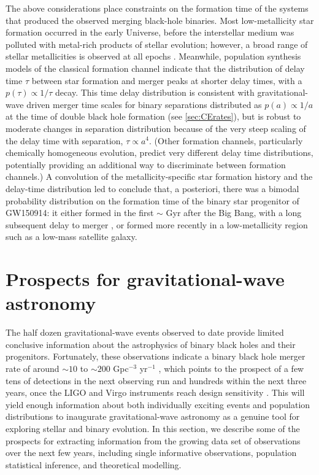 \documentclass[review]{elsarticle}
\begin{document}
The above considerations place constraints on the formation time of the systems that produced the observed merging black-hole binaries. Most low-metallicity star formation occurred in the early Universe, before the interstellar medium was polluted with metal-rich products of stellar evolution; however, a broad range of stellar metallicities is observed at all epochs  \citep[e.g.,][]{LangerNorman:2006,TaylorKobayashi:2015}. Meanwhile, population synthesis models of the classical formation channel indicate that the distribution of delay time $\tau$ between star formation and merger peaks at shorter delay times, with a $p(\tau) \propto 1/\tau$ decay.  This time delay distribution is consistent with gravitational-wave driven merger time scales for binary separations distributed as $p(a) \propto 1/a$ at the time of double black hole formation (see \autoref{sec:CErates}), but  is robust to moderate changes in separation distribution because of the very steep scaling of the delay time with separation, $\tau \propto a^4$.  (Other formation channels, particularly chemically homogeneous evolution, predict very different delay time distributions, potentially providing an additional way to discriminate between formation channels.)  A convolution of the metallicity-specific star formation history and the delay-time distribution led \citet{Belczynski:2016} to conclude that, a posteriori, there was a bimodal probability distribution on the formation time of the binary star progenitor of GW150914: it either formed in the first $\sim$ Gyr after the Big Bang, with a long subsequent delay to merger \citep{Dominik:2014}, or formed more recently in a low-metallicity region such as a low-mass satellite galaxy.  

  

\section{Prospects for gravitational-wave astronomy}\label{prospect}

The half dozen gravitational-wave events observed to date provide limited conclusive information about the astrophysics of binary black holes and their progenitors.  Fortunately, these observations indicate a binary black hole merger rate of around $\sim 10$ to $\sim 200$ Gpc$^{-3}$ yr$^{-1}$ \citep{GW150914:rates,GW170104}, which points to the prospect of a few tens of detections in the next observing run and hundreds within the next three years, once the LIGO and Virgo instruments reach design sensitivity \citep{scenarios}.  This will yield enough information about both individually exciting events and population distributions to inaugurate gravitational-wave astronomy as a genuine tool for exploring stellar and binary evolution.  In this section, we describe some of the prospects for extracting information from the growing data set of observations over the next few years, including single informative observations, population statistical inference, and theoretical modelling.
\end{document}
